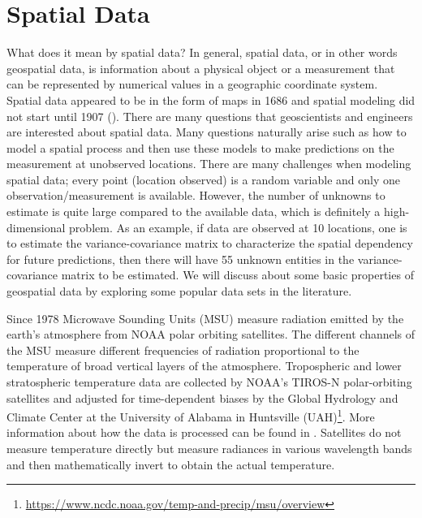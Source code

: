 %
%
%
%


\section{Spatial Data}

What does it mean by spatial data? In general, spatial data, or in other words geospatial data, is information about a physical object or a measurement that can be represented by numerical values in a geographic coordinate system. Spatial data appeared to be in the form of maps in 1686 and spatial modeling did not start until 1907 (\cite{Cressie1993}). There are many questions that geoscientists and engineers are interested about spatial data. Many questions naturally arise such as how to model a spatial process and then use these models to make predictions on the measurement at unobserved locations. There are many challenges when modeling spatial data; every point (location observed) is a random variable and only one observation/measurement is available. However, the number of unknowns to estimate is quite large compared to the available data, which is definitely a high-dimensional problem. As an example, if data are observed at 10 locations, one is to estimate the variance-covariance matrix to characterize the spatial dependency for future predictions, then there will have 55 unknown entities in the variance-covariance matrix to be estimated. We will discuss about some basic properties of geospatial data by exploring some popular data sets in the literature.

Since 1978 Microwave Sounding Units (MSU) measure radiation emitted by the earth's atmosphere from NOAA polar orbiting satellites. The different channels of the MSU measure different frequencies of radiation proportional to the temperature of broad vertical layers of the atmosphere. Tropospheric and lower stratospheric temperature data are collected by NOAA's TIROS-N polar-orbiting satellites and adjusted for time-dependent biases by the Global Hydrology and Climate Center at the University of Alabama in Huntsville (UAH)\footnote{\url{https://www.ncdc.noaa.gov/temp-and-precip/msu/overview}}. More information about how the data is processed can be found in \cite{ChristySpencerBraswell2000}. Satellites do not measure temperature directly but measure radiances in various wavelength bands and then mathematically invert to obtain the actual temperature.

